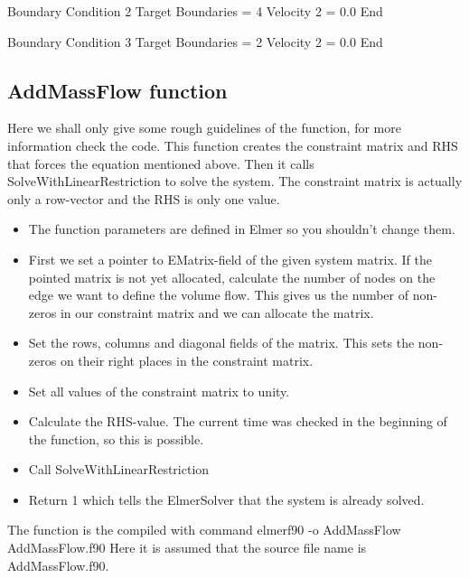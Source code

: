Boundary Condition 2
  Target Boundaries = 4
  Velocity 2 = 0.0
End

Boundary Condition 3
  Target Boundaries = 2
  Velocity 2 = 0.0
End
\ttend
\subsection*{AddMassFlow function}
Here we shall only give some rough guidelines of the function, for more information
check the code. This function creates the constraint matrix and RHS that forces the
equation mentioned above. Then it calls SolveWithLinearRestriction to solve the system.
The constraint matrix is actually only a row-vector and the RHS is only one value. 
\begin{itemize}
\item The function parameters are defined in Elmer so you shouldn't change them.
\item First we set a pointer to EMatrix-field of the given system matrix.
If the pointed matrix is not yet allocated, calculate the number of nodes
on the edge we want to define the volume flow. This gives us the number of non-zeros
in our constraint matrix and we can allocate the matrix.
\item Set the rows, columns and diagonal fields of the matrix. This sets the non-zeros
on their right places in the constraint matrix.
\item Set all values of the constraint matrix to unity.
\item Calculate the RHS-value. The current time was checked in the beginning 
of the function, so this is possible.
\item Call SolveWithLinearRestriction
\item Return 1 which tells the ElmerSolver that the system is already solved.
\end{itemize} 
The function is the compiled with command
\ttbegin
elmerf90 -o AddMassFlow AddMassFlow.f90 
\ttend
Here it is assumed that the source file name is AddMassFlow.f90.


